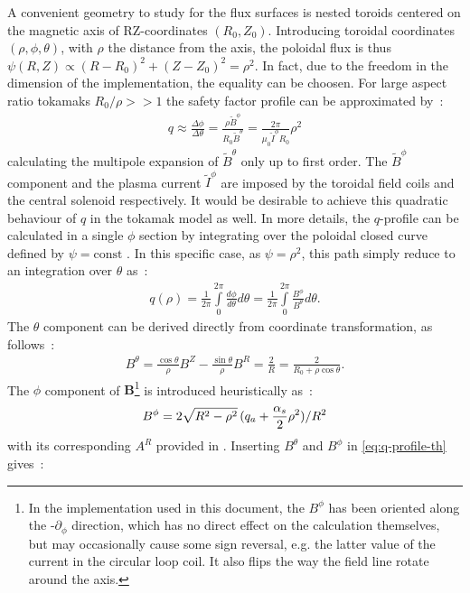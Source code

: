 A convenient geometry to study for the flux surfaces is nested toroids centered on the magnetic axis of RZ-coordinates $(R_0, Z_0)$. Introducing toroidal coordinates $(\rho, \phi, \theta)$, with $\rho$ the distance from the axis, the poloidal flux is thus $\psi(R, Z) \propto (R - R_0)^2 + (Z - Z_0)^2 = \rho^2$. In fact, due to the freedom in the dimension of the implementation, the equality can be choosen. For large aspect ratio tokamaks $R_0/\rho >> 1$ the safety factor profile can be approximated by~:
\begin{align*}
    q \approx \frac{\Delta\phi}{\Delta\theta} = \frac{\rho \tilde{B}^\phi}{R_0 \tilde{B}^\theta} = \frac{2\pi}{\mu_0\tilde{I}^\phi R_0} \rho^2
\end{align*}
calculating the multipole expansion of $\tilde{B}^\theta$ only up to first order. The $\tilde{B}^\phi$ component and the plasma current $\tilde{I}^\phi$ are imposed by the toroidal field coils and the central solenoid respectively. It would be desirable to achieve this quadratic behaviour of $q$ in the tokamak model as well. In more details, the $q$-profile can be calculated in a single $\phi$ section by integrating over the poloidal closed curve defined by $\psi = \text{const}$ \cite[pp.111-112]{wesson_tokamaks_2011}. In this specific case, as $\psi = \rho^2$, this path simply reduce to an integration over $\theta$ as~:
\begin{align}\label{eq:q-profile-th}
    q(\rho) = \frac{1}{2\pi}\int\limits_0^{2\pi} \frac{d\phi}{d\theta}d\theta = \frac{1}{2\pi}\int\limits_0^{2\pi} \frac{B^\phi}{B^\theta}d\theta.
\end{align}
The $\theta$ component can be derived directly from coordinate transformation, as follows~:
\begin{align*}
    B^\theta = \frac{\cos{\theta}}{\rho}B^Z - \frac{\sin{\theta}}{\rho}B^R = \frac{2}{R} = \frac{2}{R_0+\rho\cos{\theta}}.
\end{align*}
The $\phi$ component of $\textbf{B}$\footnote{In the implementation used in this document, the $B^\phi$ has been oriented along the -$\partial_\phi$ direction, which has no direct effect on the calculation themselves, but may occasionally cause some sign reversal, e.g. the latter value of the current in the circular loop coil. It also flips the way the field line rotate around the axis.} is introduced heuristically as~:
\begin{align*}
    B^\phi = 2\sqrt{R^2-\rho^2}\,(q_a+\frac{\alpha_s}{2}\rho^2)/R^2
\end{align*}
with its corresponding $A^R$ provided in . Inserting $B^\theta$ and $B^\phi$ in \eqref{eq:q-profile-th} gives~:
